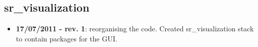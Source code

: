 
\subsection{sr\_visualization}
\label{sec:sr-visualization-changelog}

\begin{itemize}
\item \textbf{17/07/2011 - rev. 1}: reorganising the code. Created sr\_visualization stack to contain packages for the GUI.
\end{itemize}